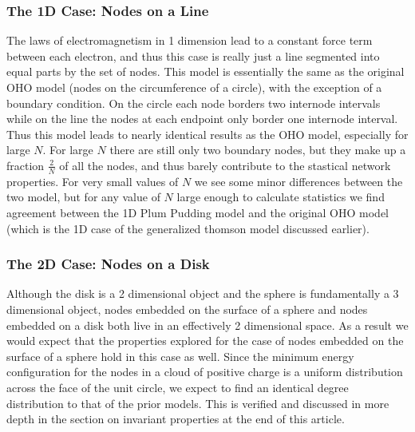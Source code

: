\documentclass[aps,pre,reprint,superscriptaddress,amsmath,amssymb,nofootinbib]{revtex4-1}
\begin{document}
\subsubsection{The 1D Case: Nodes on a Line}
The laws of electromagnetism in 1 dimension lead to a constant force term between each electron, and thus this case is really just a line segmented into equal parts by the set of nodes. 
This model is essentially the same as the original OHO model (nodes on the circumference of a circle), with the exception of a boundary condition. 
On the circle each node borders two internode intervals while on the line the nodes at each endpoint only border one internode interval.
Thus this model leads to nearly identical results as the OHO model, especially for large $N$.
For large $N$ there are still only two boundary nodes, but they make up a fraction $\frac{2}{N}$ of all the nodes, and thus barely contribute to the stastical network properties.
For very small values of $N$ we see some minor differences between the two model, but for any value of $N$ large enough to calculate statistics we find agreement between the 1D Plum Pudding model and the original OHO model (which is the 1D case of the generalized thomson model discussed earlier).



\subsubsection{The 2D Case: Nodes on a Disk}
Although the disk is a 2 dimensional object and the sphere is fundamentally a 3 dimensional object, nodes embedded on the surface of a sphere and nodes embedded on a disk both live in an effectively 2 dimensional space.
As a result we would expect that the properties explored for the case of nodes embedded on the surface of a sphere hold in this case as well.
Since the minimum energy configuration for the nodes in a cloud of positive charge is a uniform distribution across the face of the unit circle, we expect to find an identical degree distribution to that of the prior models.
This is verified and discussed in more depth in the section on invariant properties at the end of this article.
\end{document}
